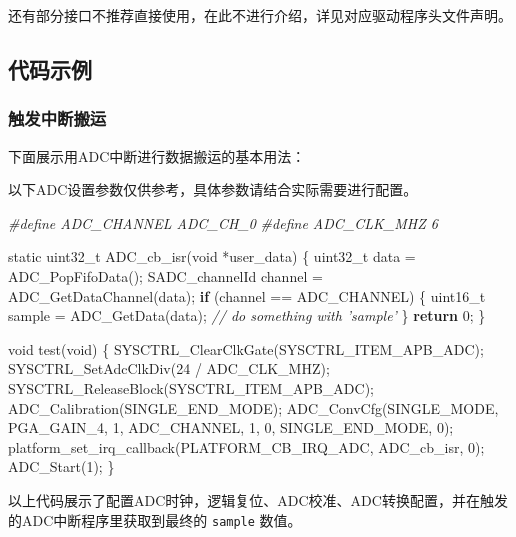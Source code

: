 \documentclass[
  12pt,
]{book}
\newenvironment{Shaded}{\begin{snugshade}}{\end{snugshade}}
\newcommand{\CommentTok}[1]{\textcolor[rgb]{0.56,0.35,0.01}{\textit{#1}}}
\newcommand{\ControlFlowTok}[1]{\textcolor[rgb]{0.13,0.29,0.53}{\textbf{#1}}}
\newcommand{\DataTypeTok}[1]{\textcolor[rgb]{0.13,0.29,0.53}{#1}}
\newcommand{\DecValTok}[1]{\textcolor[rgb]{0.00,0.00,0.81}{#1}}
\newcommand{\NormalTok}[1]{#1}
\newcommand{\PreprocessorTok}[1]{\textcolor[rgb]{0.56,0.35,0.01}{\textit{#1}}}
\begin{document}
还有部分接口不推荐直接使用，在此不进行介绍，详见对应驱动程序头文件声明。

\hypertarget{ux4ee3ux7801ux793aux4f8b}{%
\subsection{代码示例}\label{ux4ee3ux7801ux793aux4f8b}}

\hypertarget{ux89e6ux53d1ux4e2dux65adux642cux8fd0}{%
\subsubsection{触发中断搬运}\label{ux89e6ux53d1ux4e2dux65adux642cux8fd0}}

下面展示用ADC中断进行数据搬运的基本用法：

以下ADC设置参数仅供参考，具体参数请结合实际需要进行配置。

\begin{Shaded}
\begin{Highlighting}[]
\PreprocessorTok{#define ADC_CHANNEL    ADC_CH_0}
\PreprocessorTok{#define ADC_CLK_MHZ    6}

\DataTypeTok{static} \DataTypeTok{uint32_t}\NormalTok{ ADC_cb_isr(}\DataTypeTok{void}\NormalTok{ *user_data)}
\NormalTok{\{}
    \DataTypeTok{uint32_t}\NormalTok{ data = ADC_PopFifoData();}
\NormalTok{    SADC_channelId channel = ADC_GetDataChannel(data);}
    \ControlFlowTok{if}\NormalTok{ (channel == ADC_CHANNEL) \{}
        \DataTypeTok{uint16_t}\NormalTok{ sample = ADC_GetData(data);}
        \CommentTok{// do something with 'sample'}
\NormalTok{    \}}
    \ControlFlowTok{return} \DecValTok{0}\NormalTok{;}
\NormalTok{\}}

\DataTypeTok{void}\NormalTok{ test(}\DataTypeTok{void}\NormalTok{)}
\NormalTok{\{}
\NormalTok{    SYSCTRL_ClearClkGate(SYSCTRL_ITEM_APB_ADC);}
\NormalTok{    SYSCTRL_SetAdcClkDiv(}\DecValTok{24}\NormalTok{ / ADC_CLK_MHZ);}
\NormalTok{    SYSCTRL_ReleaseBlock(SYSCTRL_ITEM_APB_ADC);}
\NormalTok{    ADC_Calibration(SINGLE_END_MODE);}
\NormalTok{    ADC_ConvCfg(SINGLE_MODE, PGA_GAIN_4, }\DecValTok{1}\NormalTok{, ADC_CHANNEL, }\DecValTok{1}\NormalTok{, }\DecValTok{0}\NormalTok{, SINGLE_END_MODE, }\DecValTok{0}\NormalTok{);}
\NormalTok{    platform_set_irq_callback(PLATFORM_CB_IRQ_ADC, ADC_cb_isr, }\DecValTok{0}\NormalTok{);}
\NormalTok{    ADC_Start(}\DecValTok{1}\NormalTok{);}
\NormalTok{\}}
\end{Highlighting}
\end{Shaded}

以上代码展示了配置ADC时钟，逻辑复位、ADC校准、ADC转换配置，并在触发的ADC中断程序里获取到最终的 \texttt{sample} 数值。
\end{document}
